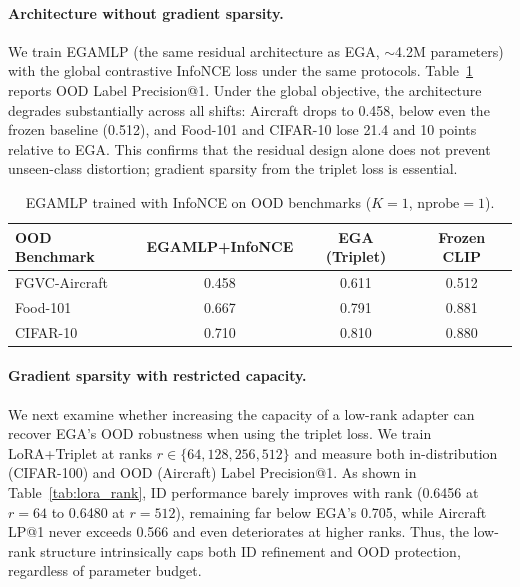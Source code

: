 \documentclass{article}
\begin{document}
\paragraph{Architecture without gradient sparsity.}
We train EGAMLP (the same residual architecture as EGA, $\sim$4.2M parameters) with the global contrastive InfoNCE loss under the same protocols.
Table~\ref{tab:ega_infonce} reports OOD Label Precision@1.
Under the global objective, the architecture degrades substantially across all shifts: Aircraft drops to 0.458, below even the frozen baseline (0.512), and Food-101 and CIFAR-10 lose 21.4 and 10 points relative to EGA.
This confirms that the residual design alone does not prevent unseen-class distortion; gradient sparsity from the triplet loss is essential.

\begin{table}[!h]
	\centering
	\caption{EGAMLP trained with InfoNCE on OOD benchmarks ($K{=}1$, $\text{nprobe}{=}1$).}
	\label{tab:ega_infonce}
	\small
	\begin{tabular}{lccc}
		\toprule
		OOD Benchmark & EGAMLP+InfoNCE & EGA (Triplet) & Frozen CLIP \\
		\midrule
		FGVC-Aircraft & 0.458          & 0.611         & 0.512       \\
		Food-101      & 0.667          & 0.791         & 0.881       \\
		CIFAR-10      & 0.710          & 0.810         & 0.880       \\
		\bottomrule
	\end{tabular}
\end{table}

\paragraph{Gradient sparsity with restricted capacity.}
We next examine whether increasing the capacity of a low-rank adapter can recover EGA's OOD robustness when using the triplet loss.
We train LoRA+Triplet at ranks $r \in \{64, 128, 256, 512\}$ and measure both in-distribution (CIFAR-100) and OOD (Aircraft) Label Precision@1.
As shown in Table~\ref{tab:lora_rank}, ID performance barely improves with rank (0.6456 at $r{=}64$ to 0.6480 at $r{=}512$), remaining far below EGA's 0.705, while Aircraft LP@1 never exceeds 0.566 and even deteriorates at higher ranks.
Thus, the low-rank structure intrinsically caps both ID refinement and OOD protection, regardless of parameter budget.
\end{document}

